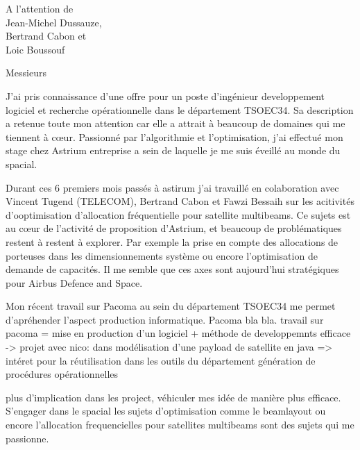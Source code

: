 \documentclass[12pt]{lettre}
\begin{document}
\begin{letter}{A l'attention de\\Jean-Michel Dussauze,\\Bertrand Cabon et\\ Loic Boussouf}
\address{Victor Cameo Ponz\\47 rue Guynemer\\31200 Toulouse}
\nofax

\opening{Messieurs}
J'ai pris connaissance d'une offre pour un poste d'ingénieur developpement logiciel et recherche opérationnelle dans le département TSOEC34.
Sa description a retenue toute mon attention car elle a attrait à beaucoup de domaines qui me tiennent à c\oe{}ur.
Passionné par l'algorithmie et l'optimisation, j'ai effectué mon stage chez Astrium entreprise a sein de laquelle je me suis éveillé au monde du spacial.

Durant ces 6 premiers mois passés à astirum j'ai travaillé en colaboration
avec Vincent Tugend (TELECOM), Bertrand Cabon et Fawzi Bessaih sur les acitivités d'ooptimisation d'allocation fréquentielle pour satellite multibeams.
Ce sujets est au cœur de l'activité de proposition d'Astrium,
et beaucoup de problématiques restent à restent à explorer.
Par exemple la prise en compte des allocations de porteuses dans les
dimensionnements système ou encore l'optimisation de demande de capacités.
Il me semble que ces axes sont aujourd'hui stratégiques pour Airbus Defence and Space.

Mon récent travail sur Pacoma au sein du département TSOEC34 me permet d'apréhender l'aspect production informatique. Pacoma bla bla.
travail sur pacoma =  mise en production d'un logiciel + méthode de developpemnts efficace ->
projet avec nico: dans modélisation d'une payload de satellite en java => intéret pour la réutilisation dans les outils du département
génération de procédures opérationnelles

plus d'implication dans les project, véhiculer mes idée de manière plus efficace. S'engager dans le spacial
les sujets d'optimisation comme le beamlayout ou encore l'allocation frequencielles pour satellites multibeams sont des sujets qui me passionne.


\end{letter}
\end{document}

